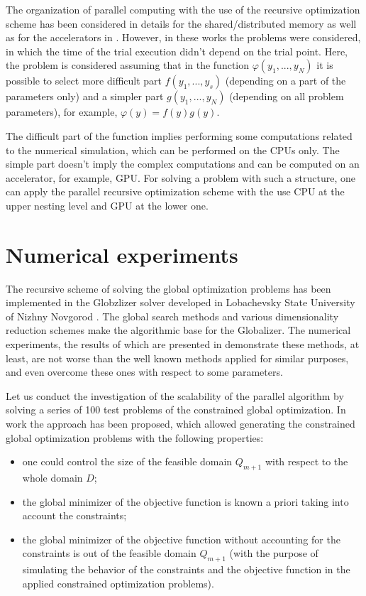 \documentclass[a4paper]{jpconf}
\begin{document}
The organization of parallel computing with the use of the recursive 
optimization scheme has been considered in details for the shared/distributed 
memory as well as for the accelerators in \cite{Sysoyev,BarkalovLebedev}. However, in these works the 
problems were considered, in which the time of the trial execution didn't 
depend on the trial point. Here, the problem is considered assuming that in 
the function $\varphi(y_1,...,y_N)$ it is possible to select more difficult 
part $f(y_1,...,y_s)$ (depending on a part of the parameters only) and a simpler 
part $g(y_1,...,y_N)$ (depending on all problem parameters), for 
example, $\varphi(y)= f(y)g(y)$.

The difficult part of the function implies performing some  
computations related to the numerical simulation, which can be performed on the 
CPUs only. The simple part doesn't imply the complex computations and can be 
computed on an accelerator, for example, GPU. For solving a problem with such 
a structure, one can apply the parallel recursive optimization scheme with 
the use CPU at the upper nesting level and GPU at the lower one.

\section{Numerical experiments}\label{sec:5}

The recursive scheme of solving the global optimization problems has been 
implemented in the Globzlizer solver developed in Lobachevsky State 
University of Nizhny Novgorod \cite{Globalizer}. The global search methods and various 
dimensionality reduction schemes make the algorithmic base for the 
Globalizer. The numerical experiments, the results of which are presented in 
\cite{BarkalovGergelLebedev,BarkalovGergel} demonstrate these methods, at least, are not worse than the well known 
methods applied for similar purposes, and even overcome these ones with 
respect to some parameters. 

Let us conduct the investigation of the scalability of the parallel 
algorithm by solving a series of 100 test problems of the constrained global 
optimization. In work \cite{Gergel2017} the approach has been proposed, which allowed 
generating the constrained global optimization problems with the following 
properties:
\begin{itemize}
	\item one could control the size of the feasible domain $Q_{m+1}$ with 
respect to the whole domain $D$;
	\item the global minimizer of the objective function is known a priori 
taking into account the constraints;
	\item the global minimizer of the objective function without accounting 
for the constraints is out of the feasible domain $Q_{m+1}$  (with the 
purpose of simulating the behavior of the constraints and the objective 
function in the applied constrained optimization problems).
\end{itemize}
\end{document}
